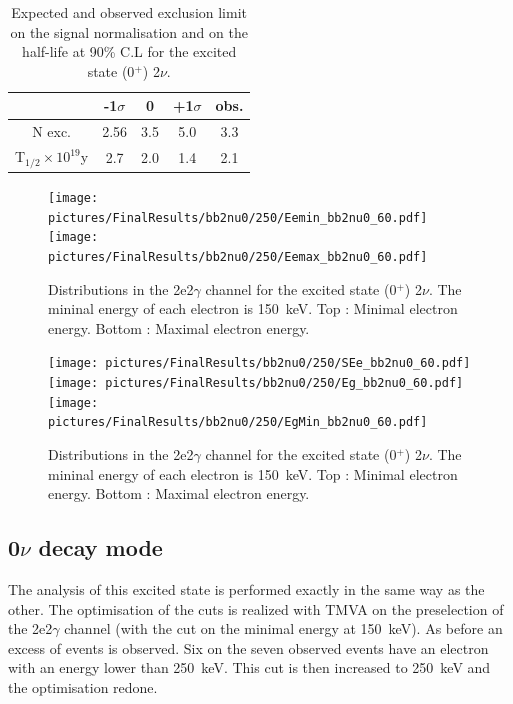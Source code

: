 \documentclass[main.tex]{subfiles}
\begin{document}
\begin{table}
\centering
\begin{tabular}{c|c|c|c||c}
                                                & -1$\sigma$ & 0        & +1$\sigma$ & obs.     \\[0.2cm]
\hline
N exc.                                          & 2.56       & 3.5      & 5.0          & 3.3     \\[0.2cm]
T$_{\text{1/2}} \times \text{10}^{\text{19}}$y  & 2.7        & 2.0      & 1.4          & 2.1      \\[0.2cm]
\hline 
\end{tabular}
\caption{Expected and observed exclusion limit on the signal normalisation and on the half-life at 90\% C.L for the excited state (0$^+$) 2$\nu$.}
\label{Tab:FinalResultsbb2nu0}
\end{table}


\begin{figure} [h!]
\begin{center}
\texttt{[image: pictures/FinalResults/bb2nu0/250/Eemin\_bb2nu0\_60.pdf]}
\texttt{[image: pictures/FinalResults/bb2nu0/250/Eemax\_bb2nu0\_60.pdf]}
\end{center}
\caption{Distributions in the 2e2$\gamma$ channel for the excited state (0$^+$) 2$\nu$. The mininal energy of each electron is 150~keV. Top : Minimal electron energy. Bottom : Maximal electron energy.}
\label{plot:EeminAndEemax250bb2nu0_250}
\end{figure}


\begin{figure} [h!]
\begin{center}
\texttt{[image: pictures/FinalResults/bb2nu0/250/SEe\_bb2nu0\_60.pdf]}
\texttt{[image: pictures/FinalResults/bb2nu0/250/Eg\_bb2nu0\_60.pdf]}
\texttt{[image: pictures/FinalResults/bb2nu0/250/EgMin\_bb2nu0\_60.pdf]}
\end{center}
\caption{Distributions in the 2e2$\gamma$ channel for the excited state (0$^+$) 2$\nu$. The mininal energy of each electron is 150~keV. Top : Minimal electron energy. Bottom : Maximal electron energy.}
\label{plot:SEeAndEg250bb2nu0_250}
\end{figure}


\FloatBarrier


\subsection{0$\nu$ decay mode}\label{Analysisbb0nu0}


\NI The analysis of this excited state is performed exactly in the same way as the other. The optimisation of the cuts is realized with TMVA on the preselection of the 2e2$\gamma$ channel (with the cut on the minimal energy at 150~keV). As before an excess of events is observed. Six on the seven observed events have an electron with an energy lower than 250~keV. This cut is then increased to 250~keV and the optimisation redone.
\end{document}
